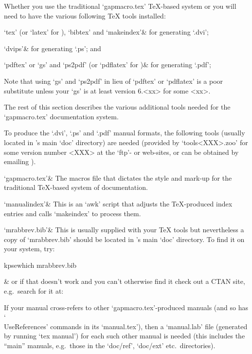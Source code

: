 
Whether you use the traditional  `gapmacro.tex'  {\TeX}-based  system  or
 you will need to have the various following {\TeX} tools
installed:

\beginitems

`tex' (or `latex' for ), `bibtex' and `makeindex'&
for generating `.dvi';

`dvips'&
for generating `.ps'; and

`pdftex' or `gs' and `ps2pdf' (or `pdflatex' for )&
for generating `.pdf';

\enditems

Note that using `gs' and `ps2pdf' in lieu of `pdftex' or `pdflatex' is  a
poor substitute unless your `gs' is at  least  version  6.<xx>  for  some
<xx>.

The rest of this section describes the various  additional  tools  needed
for the `gapmacro.tex' documentation system.

To produce the `.dvi', `.ps' and `.pdf'  manual  formats,  the  following
{\GAP} tools (usually located  in  {\GAP}'s  main  `doc'  directory)  are
needed (provided by `tools<XXX>.zoo' for some version number <XXX> at the
{\GAP}  `ftp'-  or  web-sites,   or   can   be   obtained   by   emailing
).

\beginitems

`gapmacro.tex'&
The macros file that dictates the style and mark-up for  the  traditional
{\TeX}-based system of {\GAP} documentation.

`manualindex'&
This is an `awk' script that adjusts the  {\TeX}-produced  index  entries
and calls `makeindex' to process them.

`mrabbrev.bib'&
This is usually supplied with your {\TeX} tools but nevertheless  a  copy
of `mrabbrev.bib' should be located in {\GAP}'s main `doc' directory.  To
find it on your system, try:

\begintt
kpsewhich mrabbrev.bib
\endtt

&
or if that doesn't work and you can't otherwise find it check out a  CTAN
site, e.g.~search for it at:

\enditems

If your manual cross-refers to other `gapmacro.tex'-produced manuals (and
so  has  `\\UseReferences'  commands  in  its   `manual.tex'),   then   a
`manual.lab' file (generated by running `tex manual') for each such other
manual is needed (this includes the ``main'' manuals, e.g.~those  in  the
`doc/ref', `doc/ext' etc.~directories).


